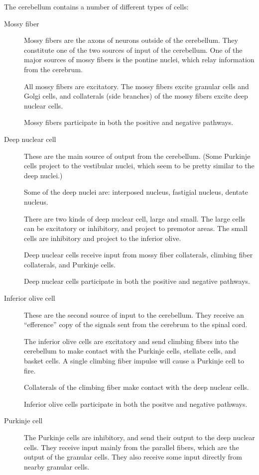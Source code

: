 \documentclass{article}
\theoremstyle{definition}
\begin{document}
The cerebellum contains a number of different types of cells:
\begin{description}
\item[Mossy fiber] Mossy fibers are the axons of neurons outside of
  the cerebellum. They constitute one of the two sources of input of
  the cerebellum. One of the major sources of mossy fibers is the
  pontine nuclei, which relay information from the cerebrum.

  All mossy fibers are excitatory. The mossy fibers excite granular
  cells and Golgi cells, and collaterals (side branches) of the mossy
  fibers excite deep nuclear cells.

  Mossy fibers participate in both the positive and negative pathways.

\item[Deep nuclear cell] These are the main source of output from the
  cerebellum. (Some Purkinje cells project to the vestibular nuclei,
  which seem to be pretty similar to the deep nuclei.)

  Some of the deep nuclei are: interposed nucleus, fastigial nucleus,
  dentate nucleus.

  There are two kinds of deep nuclear cell, large and small. The large
  cells can be excitatory or inhibitory, and project to premotor
  areas. The small cells are inhibitory and project to the inferior
  olive.

  Deep nuclear cells receive input from mossy fiber collaterals,
  climbing fiber collaterals, and Purkinje cells.

  Deep nuclear cells participate in both the positive and negative
  pathways.

\item[Inferior olive cell] These are the second source of input to the
  cerebellum. They receive an ``efference'' copy of the signals sent
  from the cerebrum to the spinal cord.

  The inferior olive cells are excitatory and send climbing fibers
  into the cerebellum to make contact with the Purkinje cells,
  stellate cells, and basket cells. A single climbing fiber impulse
  will cause a Purkinje cell to fire. 

  Collaterals of the climbing fiber make contact with the deep nuclear
  cells.

  Inferior olive cells participate in both the positve and negative
  pathways.

\item[Purkinje cell] The Purkinje cells are inhibitory, and send their
  output to the deep nuclear cells. They receive input mainly from the
  parallel fibers, which are the output of the granular cells. They
  also receive some input directly from nearby granular cells.


\end{description}
\end{document}
